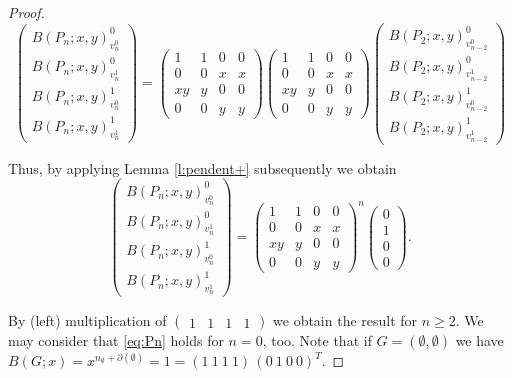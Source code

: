 \documentclass[review]{elsarticle}
\newcommand{\p}{\partial}
\begin{document}
\begin{proof}
 \[
 \left(\begin{array}{c} B(P_n;x,y)^{0}_{v^{0}_n} \\ B(P_n;x,y)^{0}_{v^{1}_n} \\ B(P_n;x,y)^{1}_{v^{0}_n} \\ B(P_n;x,y)^{1}_{v^{1}_n} \end{array}\right)
 =
 \left(\begin{array}{cccc} 1 & 1 & 0 & 0 \\ 0 & 0 & x & x \\ xy & y & 0 & 0 \\ 0 & 0 & y & y \end{array}\right)\left(\begin{array}{cccc} 1 & 1 & 0 & 0 \\ 0 & 0 & x & x \\ xy & y & 0 & 0 \\ 0 & 0 & y & y \end{array}\right) \left(\begin{array}{c} B(P_{2};x,y)^{0}_{v^{0}_{n-2}} \\ B(P_{2};x,y)^{0}_{v^{1}_{n-2}} \\ B(P_{2};x,y)^{1}_{v^{0}_{n-2}} \\ B(P_{2};x,y)^{1}_{v^{1}_{n-2}} \end{array}\right)
 \]

Thus, by applying Lemma \ref{l:pendent+} subsequently we obtain
  \[
 \left(\begin{array}{c} B(P_n;x,y)^{0}_{v^{0}_n} \\ B(P_n;x,y)^{0}_{v^{1}_n} \\ B(P_n;x,y)^{1}_{v^{0}_n}\\ B(P_n;x,y)^{1}_{v^{1} _n} \end{array}\right)
 =
 \left(\begin{array}{cccc} 1 & 1 & 0 & 0 \\ 0 & 0 & x & x \\ xy & y & 0 & 0 \\ 0 & 0 & y & y \end{array}\right)^{n}
 \left(\begin{array}{c} 0\\1\\0\\0\end{array}\right).
 \]

By (left) multiplication of
$\left(\begin{array}{cccc} 1 & 1 & 1 &1 \end{array}\right)$ 
we obtain the result for $n\ge2$. 
We may consider that \eqref{eq:Pn} holds for $n=0$,
too. Note that if $G=(\emptyset,\emptyset)$ we have
$B(G;x)=x^{n_\emptyset+\p(\emptyset)}=1=(1\ 1\ 1\ 1)\,(0\ 1\ 0\
0)^T$.
\end{proof}
\end{document}
